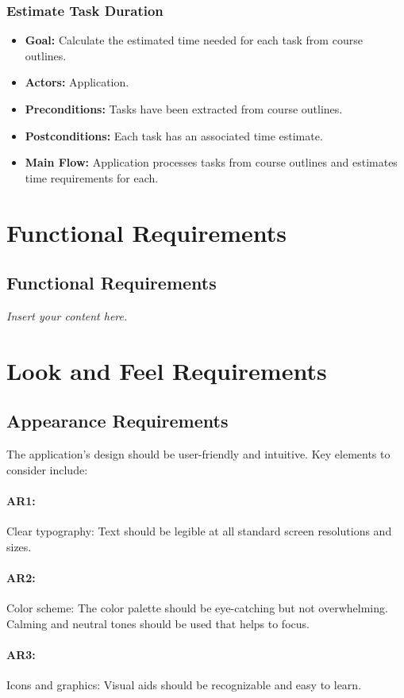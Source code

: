 \documentclass[12pt]{article}
\newcommand{\lips}{\textit{Insert your content here.}}
\begin{document}
\subsubsection{Estimate Task Duration}
\begin{itemize}
    \item \textbf{Goal:} Calculate the estimated time needed for each task from course outlines.
    \item \textbf{Actors:} Application.
    \item \textbf{Preconditions:} Tasks have been extracted from course outlines.
    \item \textbf{Postconditions:} Each task has an associated time estimate.
    \item \textbf{Main Flow:} Application processes tasks from course outlines and estimates time requirements for each.
\end{itemize}



\section{Functional Requirements}
\subsection{Functional Requirements}
\lips

\section{Look and Feel Requirements}

\subsection{Appearance Requirements}
The application's design should be user-friendly and intuitive. Key elements to consider include:
\paragraph{AR1:} Clear typography: Text should be legible at all standard screen resolutions and sizes. 
\paragraph{AR2:}Color scheme: The color palette should be eye-catching but not overwhelming. Calming and neutral tones should be used that helps to focus.
\paragraph{AR3:}Icons and graphics: Visual aids should be recognizable and easy to learn.
\end{document}
